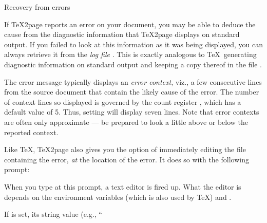 {{{{{{{{{{{{{{{ Recovery from errors

%
If \TeX2page reports an error on your document, you may
be able to deduce the cause from the diagnostic
information that \TeX2page displays  on standard
output.  If you failed to look at this information as
it was being displayed, you can always retrieve it from
the {\em log file} .  This is
exactly analogous to \TeX\ generating diagnostic
information on standard output and keeping a copy
thereof in the file .


The  error message typically displays an {\em error
context}, viz., a few consecutive lines from the source
document that contain the likely cause of the error.
The number of context lines so displayed is governed by
the count register \p{\errorcontextlines}, which has a default
value of 5.  Thus, setting  will display
seven lines.  Note that error contexts are often
only approximate — be prepared to look a little above
or below the reported context.


Like \TeX, \TeX2page also gives you the option of immediately
editing the file containing the error,
{\em at} the location of the error.  It does so with the
following prompt:


When you type  at this prompt, a text editor
is fired up.  What the editor is depends on the
environment variables  (which is also used
by \TeX) and .

If  is set, its string value (e.g.,
“\p{vim +%
is chosen as
the entire editor call, with \p{%
file’s name, and \p{%
containing the error.
If \p{TEXEDIT} is not set, or if
it is mis-set, i.e., without \p{%
editor specified in the environment variable \p{EDITOR}
is chosen.  If \p{EDITOR} is also not set, then
the editor name is assumed to be \p{vi}.
When using \p{EDITOR} or \p{vi}, the file and line number are
tacked on as arguments to the editor,
with a \p{+} preceding the
line number.  This argument style works for all \p{vi}
and \p{emacs} clones.\f{\TeX\ itself uses just \p{TEXEDIT}.
It does not fall back to \p{EDITOR} or \p{vi} if
\p{TEXEDIT} is not set.  But most Unix programs that
reach for an editor do tend to use \p{EDITOR}, and failing that,
\p{vi}, so \TeX2page does the same.}

}}}}}}}}}}}}}}}}}}}
